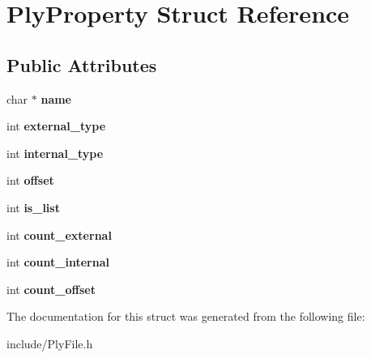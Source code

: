 \hypertarget{structPlyProperty}{\section{Ply\-Property Struct Reference}
\label{structPlyProperty}
}
\subsection*{Public Attributes}
\begin{DoxyCompactItemize}
\item 
\hypertarget{structPlyProperty_a286f11ca61eb9eaa3c52a44bbaeadfc9}{char $\ast$ {\bfseries name}}\label{structPlyProperty_a286f11ca61eb9eaa3c52a44bbaeadfc9}

\item 
\hypertarget{structPlyProperty_a0ddc732a043a2dceef8cd0849f8fe61e}{int {\bfseries external\-\_\-type}}\label{structPlyProperty_a0ddc732a043a2dceef8cd0849f8fe61e}

\item 
\hypertarget{structPlyProperty_a52decfabbe6c612b2c10213207b0a2d6}{int {\bfseries internal\-\_\-type}}\label{structPlyProperty_a52decfabbe6c612b2c10213207b0a2d6}

\item 
\hypertarget{structPlyProperty_aeedc40380a29a69699ce401f4cb7aa3f}{int {\bfseries offset}}\label{structPlyProperty_aeedc40380a29a69699ce401f4cb7aa3f}

\item 
\hypertarget{structPlyProperty_abe1deb9f2985fc45921c51b9b762a9c9}{int {\bfseries is\-\_\-list}}\label{structPlyProperty_abe1deb9f2985fc45921c51b9b762a9c9}

\item 
\hypertarget{structPlyProperty_a237469e443b4a87444ce5e21512b2649}{int {\bfseries count\-\_\-external}}\label{structPlyProperty_a237469e443b4a87444ce5e21512b2649}

\item 
\hypertarget{structPlyProperty_a3d8a82157e2863a19b63886a3488cc64}{int {\bfseries count\-\_\-internal}}\label{structPlyProperty_a3d8a82157e2863a19b63886a3488cc64}

\item 
\hypertarget{structPlyProperty_a1f788f0c065d945e271e8c4d985d2bf2}{int {\bfseries count\-\_\-offset}}\label{structPlyProperty_a1f788f0c065d945e271e8c4d985d2bf2}

\end{DoxyCompactItemize}


The documentation for this struct was generated from the following file\-:\begin{DoxyCompactItemize}
\item 
include/Ply\-File.\-h\end{DoxyCompactItemize}
